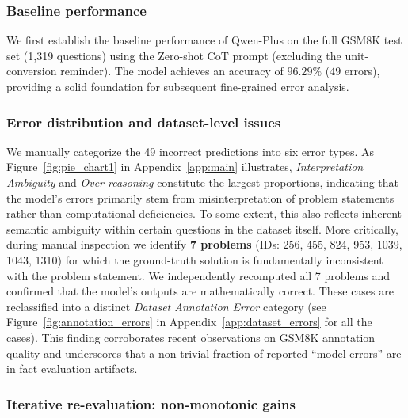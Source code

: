\documentclass{article}
\begin{document}
\subsubsection{Baseline performance}
We first establish the baseline performance of Qwen-Plus on the full GSM8K test set (1{,}319 questions) using the Zero-shot CoT prompt (excluding the unit-conversion reminder). The model achieves an accuracy of $96.29\%$ ($49$ errors), providing a solid foundation for subsequent fine-grained error analysis.
\subsubsection{Error distribution and dataset-level issues}
\label{sec:dataset_errors}

We manually categorize the 49 incorrect predictions into six error types. As Figure~\ref{fig:pie_chart1} in Appendix~\ref{app:main} illustrates, \textit{Interpretation Ambiguity} and \textit{Over-reasoning} constitute the largest proportions, indicating that the model's errors primarily stem from misinterpretation of problem statements rather than computational deficiencies. To some extent, this also reflects inherent semantic ambiguity within certain questions in the dataset itself.
More critically, during manual inspection we identify \textbf{7 problems} (IDs: 256, 455, 824, 953, 1039, 1043, 1310) for which the ground-truth solution is fundamentally inconsistent with the problem statement. 
We independently recomputed all 7 problems and confirmed that the model's outputs are mathematically correct. These cases are reclassified into a distinct \textit{Dataset Annotation Error} category (see Figure~\ref{fig:annotation_errors} in Appendix~\ref{app:dataset_errors} for all the cases). This finding corroborates recent observations on GSM8K annotation quality and underscores that a non-trivial fraction of reported ``model errors'' are in fact evaluation artifacts.

\subsubsection{Iterative re-evaluation: non-monotonic gains}
\label{sec:iterative}
\end{document}
